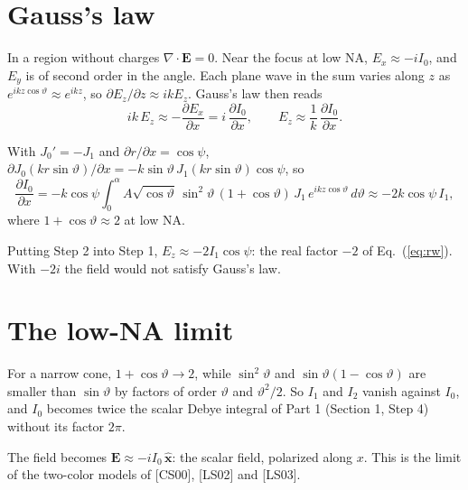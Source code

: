 \documentclass[11pt]{article}
\begin{document}
\section{Gauss's law}
 In a region without charges $\nabla\cdot\mathbf E = 0$. Near the focus at low NA, $E_x \approx -iI_0$, and
$E_y$ is of second order in the angle. Each plane wave in the sum varies along $z$ as
$e^{ikz\cos\vartheta} \approx e^{ikz}$, so $\partial E_z/\partial z \approx ikE_z$. Gauss's law then reads
\begin{equation}ik\,E_z \approx -\frac{\partial E_x}{\partial x} = i\,\frac{\partial I_0}{\partial x} ,\qquad
E_z \approx \frac1k\,\frac{\partial I_0}{\partial x} .\end{equation}

 With $J_0' = -J_1$ and $\partial r/\partial x = \cos\psi$,
$\partial J_0(kr\sin\vartheta)/\partial x = -k\sin\vartheta\,J_1(kr\sin\vartheta)\cos\psi$, so
\begin{equation}\frac{\partial I_0}{\partial x} = -k\cos\psi\int_0^\alpha A\sqrt{\cos\vartheta}\,\sin^2\!\vartheta\,
(1 + \cos\vartheta)\,J_1\,e^{ikz\cos\vartheta}\,d\vartheta \approx -2k\cos\psi\,I_1 ,\end{equation}
where $1 + \cos\vartheta \approx 2$ at low NA.

 Putting Step 2 into Step 1, $E_z \approx -2I_1\cos\psi$: the real factor $-2$ of Eq.~(\ref{eq:rw}).
With $-2i$ the field would not satisfy Gauss's law.


\section{The low-NA limit}
 For a narrow cone, $1 + \cos\vartheta \to 2$, while $\sin^2\!\vartheta$ and $\sin\vartheta(1 - \cos\vartheta)$
are smaller than $\sin\vartheta$ by factors of order $\vartheta$ and $\vartheta^2/2$. So $I_1$ and $I_2$ vanish
against $I_0$, and $I_0$ becomes twice the scalar Debye integral of Part 1 (Section 1, Step 4) without its factor $2\pi$.

 The field becomes $\mathbf E \approx -iI_0\,\hat{\mathbf x}$: the scalar field, polarized along $x$. This
is the limit of the two-color models of [CS00], [LS02] and [LS03].
\end{document}
